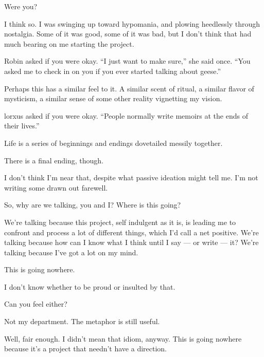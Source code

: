 \begin{paracol}{2}
\begin{leftcolumn}
\begin{ally}
Were you?
\end{ally}
I think so. I was swinging up toward hypomania, and plowing heedlessly through nostalgia. Some of it was good, some of it was bad, but I don't think that had much bearing on me starting the project.

\begin{ally}
Robin asked if you were okay. ``I just want to make sure,'' she said once. ``You asked me to check in on you if you ever started talking about geese.''
\end{ally}
Perhaps this has a similar feel to it. A similar scent of ritual, a similar flavor of mysticism, a similar sense of some other reality vignetting my vision.

\begin{ally}
lorxus asked if you were okay. ``People normally write memoirs at the ends of their lives.''
\end{ally}
Life is a series of beginnings and endings dovetailed messily together.

\begin{ally}
There is a final ending, though.
\end{ally}
I don't think I'm near that, despite what passive ideation might tell me. I'm not writing some drawn out farewell.

\begin{ally}
So, why are we talking, you and I? Where is this going?
\end{ally}
We're talking because this project, self indulgent as it is, is leading me to confront and process a lot of different things, which I'd call a net positive. We're talking because how can I know what I think until I say --- or write --- it? We're talking because I've got a lot on my mind.

This is going nowhere.

\begin{ally}
I don't know whether to be proud or insulted by that.
\end{ally}
Can you feel either?

\begin{ally}
Not my department. The metaphor is still useful.
\end{ally}
Well, fair enough. I didn't mean that idiom, anyway. This is going nowhere because it's a project that needn't have a direction.


\end{leftcolumn}
\end{paracol}
